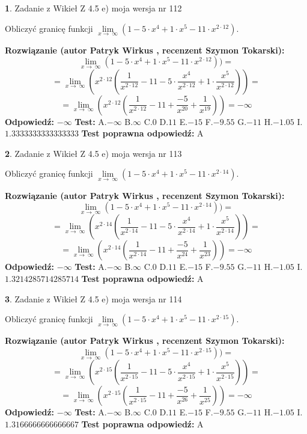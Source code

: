 \documentclass[12pt, a4paper]{article}
\theoremstyle{definition} %
\newtheorem{zad}{}
\newcommand{\zadStart}[1]{\begin{zad}#1\newline}
\newcommand{\zadStop}{\end{zad}}
\newcommand{\rozwStart}[2]{\noindent \textbf{Rozwiązanie (autor #1 , recenzent #2): }\newline}
\newcommand{\rozwStop}{\newline}
\newcommand{\odpStart}{\noindent \textbf{Odpowiedź:}\newline}
\newcommand{\odpStop}{\newline}
\newcommand{\testStart}{\noindent \textbf{Test:}\newline}
\newcommand{\testStop}{\newline}
\newcommand{\kluczStart}{\noindent \textbf{Test poprawna odpowiedź:}\newline}
\newcommand{\kluczStop}{\newline}
\begin{document}
\zadStart{Zadanie z Wikieł Z 4.5 e) moja wersja nr 112}


Obliczyć granicę funkcji  $\lim\limits_{x\to\ \infty}(1 - 5 \cdot x^{4}+1 \cdot x^{5}- 11 \cdot x^{2\cdot12})$.
\zadStop
\rozwStart{Patryk Wirkus}{Szymon Tokarski}
$$\lim\limits_{x\to\ \infty}(1 - 5 \cdot x^{4}+1 \cdot x^{5}- 11 \cdot x^{2\cdot12}))=$$
$$=\lim\limits_{x\to\ \infty}(x^{2\cdot12}(\frac{1}{x^{2\cdot12}}-11 -5 \cdot \frac{x^{4}}{x^{2\cdot12}}+1 \cdot \frac{x^{5}}{x^{2\cdot12}}))=$$
$$=\lim\limits_{x\to\ \infty}(x^{2\cdot12}(\frac{1}{x^{2\cdot12}}-11 + \frac{-5}{x^{20}}+ \frac{1}{x^{19}}))=-\infty$$
\rozwStop
\odpStart
$-\infty$
\odpStop
\testStart
A.$-\infty$ B.$\infty$ C.$0$ D.$11$ E.$-15$
F.$-9.55$ G.$-11$
H.$-1.05$
I.$1.3333333333333333$
\testStop
\kluczStart
A
\kluczStop



\zadStart{Zadanie z Wikieł Z 4.5 e) moja wersja nr 113}


Obliczyć granicę funkcji  $\lim\limits_{x\to\ \infty}(1 - 5 \cdot x^{4}+1 \cdot x^{5}- 11 \cdot x^{2\cdot14})$.
\zadStop
\rozwStart{Patryk Wirkus}{Szymon Tokarski}
$$\lim\limits_{x\to\ \infty}(1 - 5 \cdot x^{4}+1 \cdot x^{5}- 11 \cdot x^{2\cdot14}))=$$
$$=\lim\limits_{x\to\ \infty}(x^{2\cdot14}(\frac{1}{x^{2\cdot14}}-11 -5 \cdot \frac{x^{4}}{x^{2\cdot14}}+1 \cdot \frac{x^{5}}{x^{2\cdot14}}))=$$
$$=\lim\limits_{x\to\ \infty}(x^{2\cdot14}(\frac{1}{x^{2\cdot14}}-11 + \frac{-5}{x^{24}}+ \frac{1}{x^{23}}))=-\infty$$
\rozwStop
\odpStart
$-\infty$
\odpStop
\testStart
A.$-\infty$ B.$\infty$ C.$0$ D.$11$ E.$-15$
F.$-9.55$ G.$-11$
H.$-1.05$
I.$1.3214285714285714$
\testStop
\kluczStart
A
\kluczStop



\zadStart{Zadanie z Wikieł Z 4.5 e) moja wersja nr 114}


Obliczyć granicę funkcji  $\lim\limits_{x\to\ \infty}(1 - 5 \cdot x^{4}+1 \cdot x^{5}- 11 \cdot x^{2\cdot15})$.
\zadStop
\rozwStart{Patryk Wirkus}{Szymon Tokarski}
$$\lim\limits_{x\to\ \infty}(1 - 5 \cdot x^{4}+1 \cdot x^{5}- 11 \cdot x^{2\cdot15}))=$$
$$=\lim\limits_{x\to\ \infty}(x^{2\cdot15}(\frac{1}{x^{2\cdot15}}-11 -5 \cdot \frac{x^{4}}{x^{2\cdot15}}+1 \cdot \frac{x^{5}}{x^{2\cdot15}}))=$$
$$=\lim\limits_{x\to\ \infty}(x^{2\cdot15}(\frac{1}{x^{2\cdot15}}-11 + \frac{-5}{x^{26}}+ \frac{1}{x^{25}}))=-\infty$$
\rozwStop
\odpStart
$-\infty$
\odpStop
\testStart
A.$-\infty$ B.$\infty$ C.$0$ D.$11$ E.$-15$
F.$-9.55$ G.$-11$
H.$-1.05$
I.$1.3166666666666667$
\testStop
\kluczStart
A
\kluczStop
\end{document}
